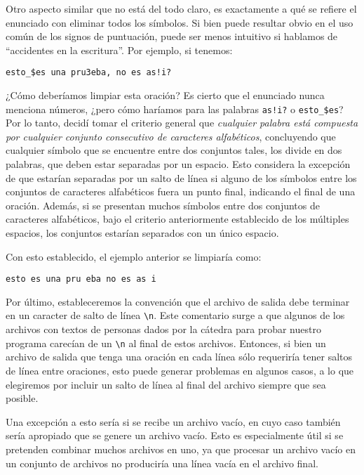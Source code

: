 \documentclass[a4paper]{article}
\begin{document}
Otro aspecto similar que no está del todo claro, es exactamente a qué se refiere el enunciado con eliminar todos los símbolos. Si bien puede resultar obvio en el uso común de los signos de puntuación, puede ser menos intuitivo si hablamos de ``accidentes en la escritura''. Por ejemplo, si tenemos:

\begin{tcolorbox}
    \texttt{esto\_\$es una pru3eba, no es as!i?}
\end{tcolorbox}

¿Cómo deberíamos limpiar esta oración? Es cierto que el enunciado nunca menciona números, ¿pero cómo haríamos para las palabras \texttt{as!i?} o \texttt{esto\_\$es}? Por lo tanto, decidí tomar el criterio general que \textit{cualquier palabra está compuesta por cualquier conjunto consecutivo de caracteres alfabéticos}, concluyendo que cualquier símbolo que se encuentre entre dos conjuntos tales, los divide en dos palabras, que deben estar separadas por un espacio. Esto considera la excepción de que estarían separadas por un salto de línea si alguno de los símbolos entre los conjuntos de caracteres alfabéticos fuera un punto final, indicando el final de una oración. Además, si se presentan muchos símbolos entre dos conjuntos de caracteres alfabéticos, bajo el criterio anteriormente establecido de los múltiples espacios, los conjuntos estarían separados con un único espacio.

Con esto establecido, el ejemplo anterior se limpiaría como:

\begin{tcolorbox}
    \texttt{esto es una pru eba no es as i}
\end{tcolorbox}

\vspace{10pt}

Por último, estableceremos la convención que el archivo de salida debe terminar en un caracter de salto de línea \texttt{\textbackslash{}n}. Este comentario surge a que algunos de los archivos con textos de personas dados por la cátedra para probar nuestro programa carecían de un \texttt{\textbackslash{}n} al final de estos archivos. Entonces, si bien un archivo de salida que tenga una oración en cada línea sólo requeriría tener saltos de línea entre oraciones, esto puede generar problemas en algunos casos\cite{NewlineStackoverflow}, a lo que elegiremos por incluir un salto de línea al final del archivo siempre que sea posible.

Una excepción a esto sería si se recibe un archivo vacío, en cuyo caso también sería apropiado que se genere un archivo vacío. Esto es especialmente útil si se pretenden combinar muchos archivos en uno, ya que procesar un archivo vacío en un conjunto de archivos no produciría una línea vacía en el archivo final.
\end{document}
